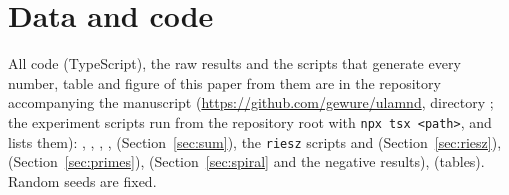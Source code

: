 \documentclass[11pt,a4paper]{article}
\theoremstyle{remark}\newtheorem{remark}[theorem]{Remark}
\begin{document}
\section*{Data and code}

All code (TypeScript), the raw results and the scripts that generate every number, table and figure of
this paper from them are in the repository accompanying the manuscript
(\url{https://github.com/gewure/ulamnd}, directory ; the experiment scripts run from the repository
root with \texttt{npx tsx <path>}, and  lists them): ,
, , , 
(Section~\ref{sec:sum}),
the \texttt{riesz} scripts and  (Section~\ref{sec:riesz}),
 (Section~\ref{sec:primes}),
 (Section~\ref{sec:spiral} and the negative results),
 (tables). Random seeds are fixed.
\end{document}

